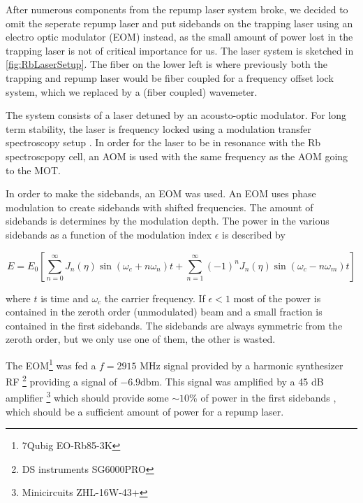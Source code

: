 After numerous components from the repump laser system broke, we decided to omit the seperate repump laser and put sidebands on the trapping laser using an electro optic modulator (EOM) instead, as the small amount of power lost in the trapping laser is not of critical importance for us.
The laser system is sketched in \cref{fig:RbLaserSetup}. 
The fiber on the lower left is where previously both the trapping and repump laser would be fiber coupled for a frequency offset lock system, which we replaced by a (fiber coupled) wavemeter. 

The system consists of a laser detuned by an acousto-optic modulator. For long term stability, the laser is frequency locked using a modulation transfer spectroscopy setup \cite{McCarron2008,Reijnders2010}.
In order for the laser to be in resonance with the Rb spectroscpopy cell, an AOM is used with the same frequency as the AOM going to the MOT. 


In order to make the sidebands, an EOM was used. 
An EOM uses phase modulation to create sidebands with shifted frequencies. 
The amount of sidebands is determines by the modulation depth.
The power in the various sidebands as a function of the modulation index $\epsilon$ is described by \cite{McCarron2008}

\begin{equation}
    E = E_0 \left[
        \sum_{n=0}^{\infty} J_n(\eta)\sin{(\omega_c+n\omega_n)t}+
        \sum_{n=1}^{\infty} (-1)^n J_n(\eta) \sin{(\omega_c-n\omega_m)t}
    \right]
\end{equation}

where $t$ is time and $\omega_c$ the carrier frequency. If $\epsilon <1$ most of the power is contained in the zeroth order (unmodulated) beam and a small fraction is contained in the first sidebands.
The sidebands are always symmetric from the zeroth order, but we only use one of them, the other is wasted. 

The EOM\footnote{7Qubig EO-Rb85-3K} was fed a $f = 2915$ MHz signal provided by a harmonic synthesizer RF \footnote{DS instruments SG6000PRO} providing a signal of $-6.9$dbm.
This signal was amplified by a 45 dB amplifier \footnote{Minicircuits ZHL-16W-43+} which should provide some $\sim 10$\% of power in the first sidebands \cite{Rens2014}, which should be a sufficient amount of power for a repump laser. 


